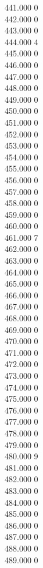 { 441.000	0 \\
 442.000	0 \\
 443.000	0 \\
 444.000	4 \\
 445.000	0 \\
 446.000	0 \\
 447.000	0 \\
 448.000	0 \\
 449.000	0 \\
 450.000	0 \\
 451.000	0 \\
 452.000	0 \\
 453.000	0 \\
 454.000	0 \\
 455.000	0 \\
 456.000	0 \\
 457.000	0 \\
 458.000	0 \\
 459.000	0 \\
 460.000	0 \\
 461.000	7 \\
 462.000	0 \\
 463.000	0 \\
 464.000	0 \\
 465.000	0 \\
 466.000	0 \\
 467.000	0 \\
 468.000	0 \\
 469.000	0 \\
 470.000	0 \\
 471.000	0 \\
 472.000	0 \\
 473.000	0 \\
 474.000	0 \\
 475.000	0 \\
 476.000	0 \\
 477.000	0 \\
 478.000	0 \\
 479.000	0 \\
 480.000	9 \\
 481.000	0 \\
 482.000	0 \\
 483.000	0 \\
 484.000	0 \\
 485.000	0 \\
 486.000	0 \\
 487.000	0 \\
 488.000	0 \\
 489.000	0 \\
}
